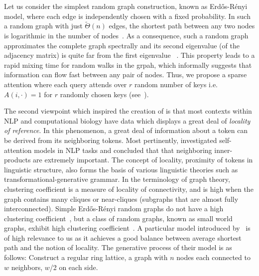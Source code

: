 Let us consider the simplest random graph construction, known as  Erd\H{o}s-R\'enyi model, where each edge is independently chosen with a fixed probability.
In such a random graph with just $\tilde{\Theta}(n)$ edges, %
the shortest path between any two nodes is logarithmic in the number of nodes~\citep{chung2002average, katzav2018distribution}.
As a consequence, such a random graph approximates the complete graph spectrally and its second eigenvalue (of the adjacency matrix) is quite far from the first eigenvalue ~\citep{benaych2019largest,benaych2020spectral,alt2019extremal}. 
This property leads to a rapid mixing time for random walks in the grpah, which informally suggests that information can flow fast between any pair of nodes.
Thus, we propose a sparse attention where each query attends over $r$ random number of keys i.e. $A(i, \cdot ) = 1$ for $r$ randomly chosen keys (see~).

The second viewpoint which inspired the creation of \bigb is that  most contexts within NLP and computational biology have data which displays a great deal of \emph{locality of reference}. 
In this phenomenon, a great deal of information about a token can be derived from its neighboring tokens. 
Most pertinently, \citet{clark2019does} investigated self-attention models in NLP tasks and concluded that that neighboring inner-products are extremely important. 
The concept of locality, proximity of tokens in linguistic structure, also forms the basis of various linguistic theories such as transformational-generative grammar.
In the terminology of graph theory, clustering coefficient is a measure of locality of connectivity, and is high when the graph contains many cliques or near-cliques (subgraphs that are almost fully interconnected).
Simple Erd\H{o}s-R\'enyi random graphs do not have a high clustering coefficient~\citep{sussman2017clusteringcoeff}, but
a class of random graphs, known as small world graphs, exhibit high clustering coefficient~\citep{watts1998collective}.
A particular model introduced by~\citet{watts1998collective} is of high relevance to us as it achieves a good balance between average shortest path and the notion of locality.
The generative process of their model is as follows:
Construct a regular ring lattice, a graph with $n$ nodes each connected to $w$ neighbors, $w$/2 on each side.

